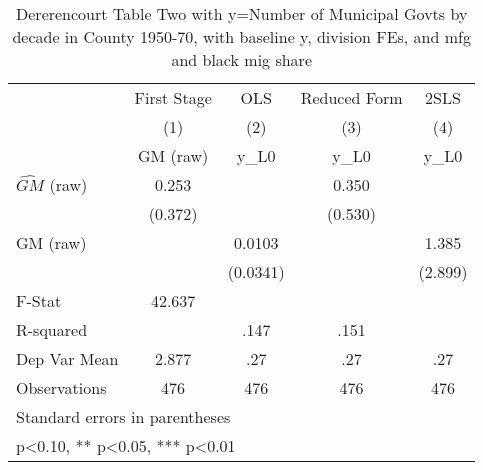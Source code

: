 \begin{table}[htbp]\centering
\def\sym#1{\ifmmode^{#1}\else\(^{#1}\)\fi}
\caption{Dererencourt Table Two with y=Number of Municipal Govts by decade in County 1950-70, with baseline y, division FEs, and mfg and black mig share}
\begin{tabular}{l*{4}{c}}
\toprule
                    & First Stage   &         OLS   &Reduced Form   &        2SLS   \\
                    &\multicolumn{1}{c}{(1)}&\multicolumn{1}{c}{(2)}&\multicolumn{1}{c}{(3)}&\multicolumn{1}{c}{(4)}\\
                    &\multicolumn{1}{c}{GM  (raw)}&\multicolumn{1}{c}{y\_L0}&\multicolumn{1}{c}{y\_L0}&\multicolumn{1}{c}{y\_L0}\\
\midrule
$\hat{GM}$ (raw)    &       0.253   &               &       0.350   &               \\
                    &     (0.372)   &               &     (0.530)   &               \\
\addlinespace
GM  (raw)           &               &      0.0103   &               &       1.385   \\
                    &               &    (0.0341)   &               &     (2.899)   \\
\midrule
F-Stat              &      42.637   &               &               &               \\
R-squared           &               &        .147   &        .151   &               \\
Dep Var Mean        &       2.877   &         .27   &         .27   &         .27   \\
Observations        &         476   &         476   &         476   &         476   \\
\bottomrule
\multicolumn{5}{l}{\footnotesize Standard errors in parentheses}\\
\multicolumn{5}{l}{\footnotesize * p<0.10, ** p<0.05, *** p<0.01}\\
\end{tabular}
\end{table}
